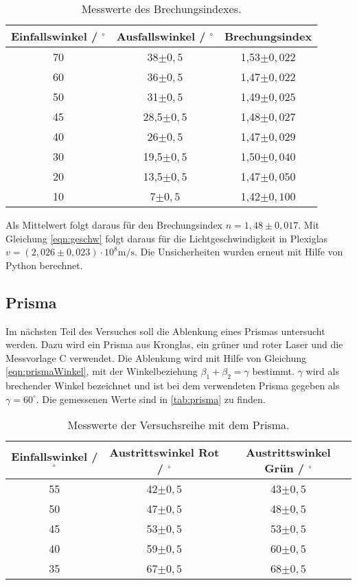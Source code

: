 \begin{table}[H]
  \centering
  \caption{Messwerte des Brechungsindexes.}
  \label{tab:brech}
  \begin{tabular}{c c c}
    \toprule
    Einfallswinkel / $^{\circ}$ & Ausfallswinkel / $^{\circ}$ & Brechungsindex \\
    \midrule
    70 & 38$\pm 0,5$ & 1,53$\pm 0,022$\\
    60 & 36$\pm 0,5$ & 1,47$\pm 0,022$\\
    50 & 31$\pm 0,5$ & 1,49$\pm 0,025$\\
    45 & 28,5$\pm 0,5$ & 1,48$\pm 0,027$\\
    40 & 26$\pm 0,5$ & 1,47$\pm 0,029$\\
    30 & 19,5$\pm 0,5$ & 1,50$\pm 0,040$\\
    20 & 13,5$\pm 0,5$ & 1,47$\pm 0,050$\\
    10 & 7$\pm 0,5$ & 1,42$\pm 0,100$\\
    \bottomrule
  \end{tabular}
\end{table}

\noindent
Als Mittelwert folgt daraus für den Brechungsindex $n = 1,48 \pm 0,017$. Mit Gleichung \eqref{eqn:geschw} folgt daraus für die Lichtgeschwindigkeit in Plexiglas
$v = (2,026 \pm 0,023) \cdot 10^8 \si{\meter\per\second}$. Die Unsicherheiten wurden erneut mit Hilfe von Python berechnet.

\subsection{Prisma}

Im nächsten Teil des Versuches soll die Ablenkung eines Prismas untersucht werden. Dazu wird ein Prisma aus Kronglas, ein grüner und roter Laser und die Messvorlage C
verwendet. Die Ablenkung wird mit Hilfe von Gleichung \eqref{eqn:prismaWinkel}, mit der Winkelbeziehung $\beta_1 + \beta_2 = \gamma$ bestimmt. $\gamma$ wird
als brechender Winkel bezeichnet und ist bei dem verwendeten Prisma gegeben als $\gamma = 60^{\circ}$.
\newline
Die gemessenen Werte sind in \autoref{tab:prisma} zu finden.

\begin{table}[H]
  \centering
  \caption{Messwerte der Versuchsreihe mit dem Prisma.}
  \label{tab:prisma}
  \begin{tabular}{c c c}
    \toprule
    Einfallswinkel / $^{\circ}$ & Austrittswinkel Rot / $^{\circ}$ & Austrittswinkel Grün / $^{\circ}$\\
    \midrule
    55 & 42$\pm 0,5$ & 43$\pm 0,5$\\
    50 & 47$\pm 0,5$ & 48$\pm 0,5$\\
    45 & 53$\pm 0,5$ & 53$\pm 0,5$\\
    40 & 59$\pm 0,5$ & 60$\pm 0,5$\\
    35 & 67$\pm 0,5$ & 68$\pm 0,5$\\
    \bottomrule
  \end{tabular}
\end{table}

